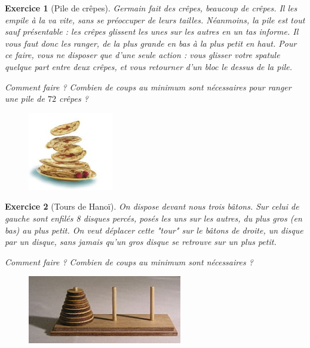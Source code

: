 \documentclass[12pt]{article}
\theoremstyle{break}
\newtheorem{exo}{Exercice}
\begin{document}
\begin{exo}[Pile de crêpes]
Germain fait des crêpes, beaucoup de crêpes. Il les empile à la va vite, sans se préoccuper de leurs tailles. Néanmoins, la pile est tout sauf présentable : les crêpes glissent les unes sur les autres en un tas informe. Il vous faut donc les ranger, de la plus grande en bas à la plus petit en haut. Pour ce faire, vous ne disposer que d'une seule action : vous glisser votre spatule quelque part entre deux crêpes, et vous retourner d'un bloc le dessus de la pile.

Comment faire ? Combien de coups au minimum sont nécessaires pour ranger une pile de $72$ crêpes ?

\begin{figure}[h!]
	\centering
    \includegraphics[width=0.33\textwidth]{PileDeCrepes.jpg}
\end{figure}
\end{exo}


\begin{exo}[Tours de Hanoï]
On dispose devant nous trois bâtons. Sur celui de gauche sont enfilés 8 disques percés, posés les uns sur les autres, du plus gros (en bas) au plus petit. On veut déplacer cette "tour" sur le bâtons de droite, un disque par un disque, sans jamais qu'un gros disque se retrouve sur un plus petit.

Comment faire ? Combien de coups au minimum sont nécessaires ?

\begin{figure}[h!]
	\centering
    \includegraphics[width=0.6\textwidth]{TourDeHanoi.jpeg}
\end{figure}
\end{exo}
\end{document}
